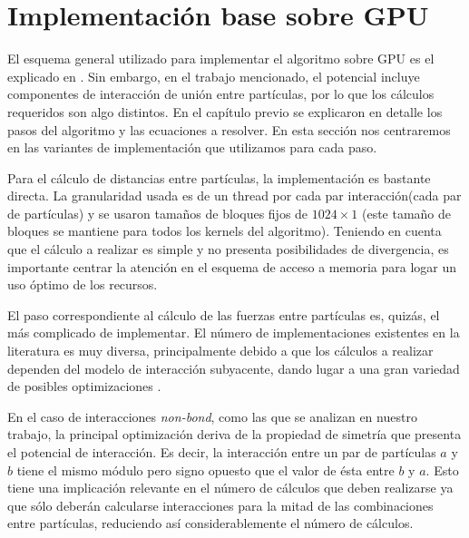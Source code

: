 



\section{Implementación base sobre GPU}
El esquema general utilizado para implementar el algoritmo sobre GPU es el explicado en \cite{friedrichs2009accelerating}. 
Sin embargo, en el trabajo mencionado, el potencial incluye componentes de interacción de unión entre partículas, por lo que los cálculos requeridos son algo distintos.
En el capítulo previo se explicaron en detalle los pasos del algoritmo y las ecuaciones a resolver. En esta sección nos centraremos en las variantes de implementación que utilizamos para cada paso.

Para el cálculo de distancias entre partículas, la implementación es bastante directa. La granularidad usada es de un thread por cada par interacción(cada par de partículas) y se usaron tamaños de bloques fijos de $1024\times1$ 
(este tamaño de bloques se mantiene para todos los kernels del algoritmo).
Teniendo en cuenta que el cálculo a realizar es  simple y no presenta posibilidades de divergencia, es importante centrar la atención en el esquema de acceso a memoria para logar un uso óptimo de los recursos.

El paso correspondiente al cálculo de las fuerzas entre partículas es, quizás, el más complicado de implementar. El número de implementaciones existentes en la literatura es muy diversa, 
principalmente debido a que los cálculos a realizar dependen del modelo de interacción subyacente, dando lugar a una gran variedad de posibles optimizaciones \cite{friedrichs2009accelerating}\cite{gotz2012routine}\cite{salomon2013routine}.

En el caso de interacciones \textit{non-bond}, como las que se analizan en nuestro trabajo, la principal optimización deriva de la propiedad de simetría que presenta el potencial de interacción.
Es decir, la interacción entre un par de partículas $a$ y $b$ tiene el mismo módulo pero signo opuesto que el valor de ésta entre $b$ y $a$. 
Esto tiene una implicación relevante en el número de cálculos que deben realizarse ya que sólo deberán calcularse interacciones para la mitad de las combinaciones entre partículas, reduciendo así considerablemente el número de cálculos.

